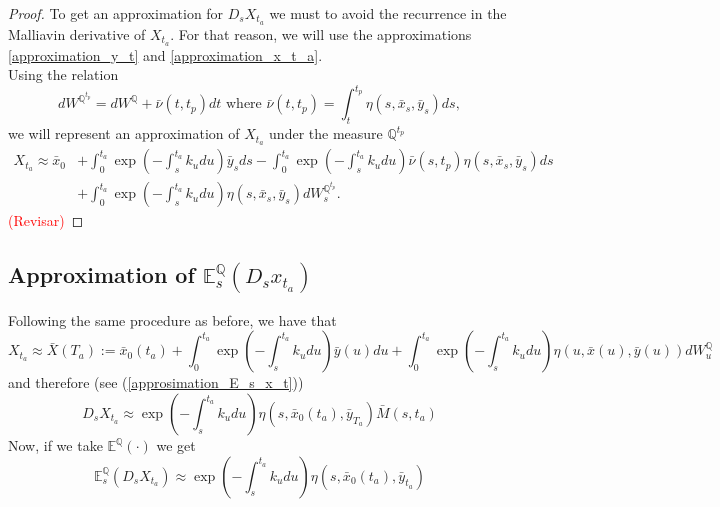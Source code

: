 \documentclass[a4paper,10pt]{article}
\newcommand{\1}{\mathbf{1}}
\begin{document}
\begin{proof}
To get an approximation for $D_sX_{t_a}$ we must to avoid the recurrence in the Malliavin derivative of $X_{t_a}$. For that reason, we will use the approximations \eqref{approximation_y_t} and \eqref{approximation_x_t_a}.\\

Using the relation 
\begin{equation*}
dW^{\mathbb{Q}^{t_p}} = dW^{\mathbb{Q}} + \bar{\nu}(t,t_p) dt \text{ where }\bar{\nu}(t,t_p) = \int_{t}^{t_p} \eta(s,\bar{x}_s,\bar{y}_s) ds,
\end{equation*}
we will represent an approximation of $X_{t_a}$ under the measure $\mathbb{Q}^{t_p}$ 
\begin{align*}
X_{t_a} \approx \bar{x}_0  &+ \int_{0}^{t_a} \exp\left(-\int_{s}^{t_a}k_u du\right) \bar{y}_s ds - \int_{0}^{t_a} \exp\left(-\int_{s}^{t_a}k_u du\right) \bar{\nu}(s, t_p) \eta(s,\bar{x}_s,\bar{y}_s) ds   \\
&+ \int_{0}^{t_a}  \exp\left(-\int_{s}^{t_a}k_u du \right)\eta(s,\bar{x}_s,\bar{y}_s) dW_s^{\mathbb{Q}^{t_p}}. 
\end{align*}
\textcolor{red}{(Revisar)}
\end{proof}

\subsection{Approximation of $\mathbb{E}_s^{\mathbb{Q}}\left(D_s x_{t_a}\right)$}
Following the same procedure as before, we have that
\begin{equation*}
X_{t_a} \approx \bar{X}(T_a):= \bar{x}_0(t_a)  + \int_{0}^{t_a} \exp\left(-\int_{s}^{t_a}k_u du\right) \bar{y}(u) du + \int_{0}^{t_a}  \exp\left(-\int_{s}^{t_a}k_u du \right) \eta(u,\bar{x}(u),\bar{y}(u)) dW_u^{\mathbb{Q}}  
\end{equation*}
and therefore (see (\ref{approsimation_E_s_x_t}))
\begin{equation}
D_sX_{t_a} \approx  \exp\left(-\int_{s}^{t_a}k_u du \right) \eta(s,\bar{x}_0(t_a),\bar{y}_{T_a})\bar{M}(s,t_a)
\end{equation}
Now, if we take $\mathbb{E}^{\mathbb{Q}}\left(\cdot\right)$ we get
\begin{equation}\label{approximation_spot_E_s_x_t}
\mathbb{E}^{\mathbb{Q}}_s\left(D_sX_{t_a} \right) \approx \exp\left(-\int_{s}^{t_a}k_u du \right) \eta(s,\bar{x}_0(t_a),\bar{y}_{t_a})
\end{equation}
\end{document}
